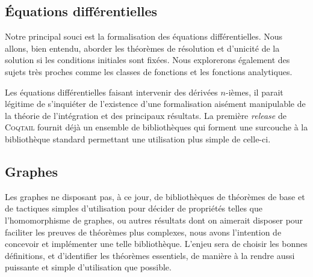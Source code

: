 \documentclass[11pt]{article}
\newcommand{\coqtail}{\textsc{Coqtail}}
\begin{document}
\subsection{Équations différentielles}

Notre principal souci est la formalisation des équations différentielles. Nous allons, bien entendu, aborder les théorèmes de résolution et d'unicité de la solution si les conditions initiales sont fixées. Nous explorerons également des sujets très proches comme les classes de fonctions et les fonctions analytiques.

Les équations différentielles faisant intervenir des dérivées $n$-ièmes, il parait légitime de s'inquiéter de l'existence d'une formalisation aisément manipulable de la théorie de l'intégration et des principaux résultats. La première \textit{release} de \coqtail{} fournit déjà un ensemble de bibliothèques qui forment une surcouche à la bibliothèque standard permettant une utilisation plus simple de celle-ci.

\subsection{Graphes}

Les graphes ne disposant pas, à ce jour, de bibliothèques de théorèmes de base et de tactiques simples d'utilisation pour décider de propriétés telles que l'homomorphisme de graphes, ou autres résultats dont on aimerait disposer pour faciliter les preuves de théorèmes plus complexes, nous avons l'intention de concevoir et implémenter une telle bibliothèque. L'enjeu sera de choisir les bonnes définitions, et d'identifier les théorèmes essentiels, de manière à la rendre aussi puissante et simple d'utilisation que possible.
\end{document}
